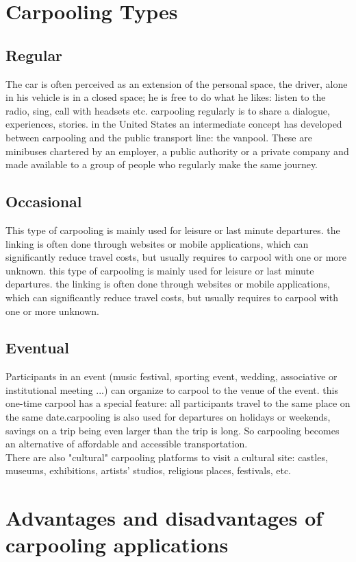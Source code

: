 \section{Carpooling Types}
\subsection{Regular}
The car is often perceived as an extension of the personal space, the driver, alone in his vehicle is in a closed space; he is free to do what he likes: listen to the radio, sing, call with headsets etc. carpooling regularly is to share a dialogue, experiences, stories. in the United States an intermediate concept has developed between carpooling and the public transport line: the vanpool. These are minibuses chartered by an employer, a public authority or a private company and made available to a group of people who regularly make the same journey.

\subsection{Occasional}
This type of carpooling is mainly used for leisure or last minute departures. the linking is often done through websites or mobile applications, which can significantly reduce travel costs, but usually requires to carpool with one or more unknown.
this type of carpooling is mainly used for leisure or last minute departures. the linking is often done through websites or mobile applications, which can significantly reduce travel costs, but usually requires to carpool with one or more unknown.

\subsection{Eventual}
Participants in an event (music festival, sporting event, wedding, associative or 
institutional meeting ...) can organize to carpool to the venue of the event. this one-time carpool has a special feature: all participants travel to the same place on the same date.carpooling is also used for departures on holidays or weekends, savings on a trip being even larger than the trip is long. So carpooling becomes an alternative of affordable and accessible transportation.
\\ There are also "cultural" carpooling platforms to visit a cultural site: castles, 
museums, exhibitions, artists' studios, religious places, festivals, etc.
\section{Advantages and disadvantages of carpooling applications}
